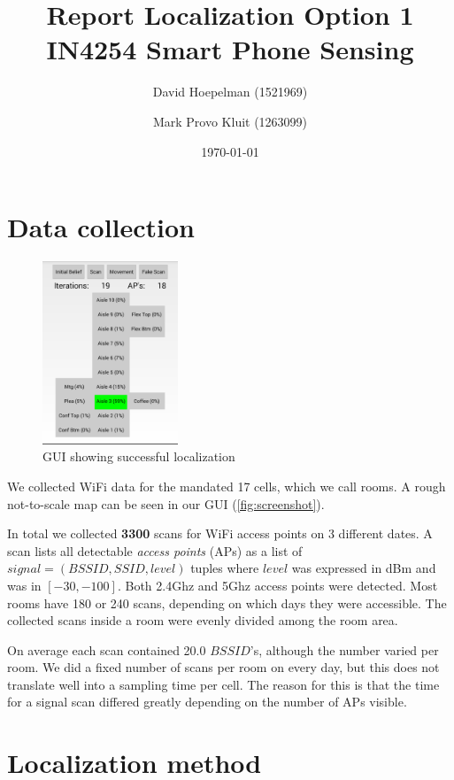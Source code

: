 \documentclass[a4paper,10pt,twoside]{IEEEtran}
\title{\huge{\textbf{Report Localization Option 1}\\IN4254 Smart Phone Sensing}}
\date{\today}
\author{David Hoepelman (1521969) \and Mark Provo Kluit (1263099)}
\begin{document}
\maketitle

\section{Data collection}
\label{sec:localization-method}

\begin{figure}
  \centering
    \includegraphics[width=0.36\textwidth]{screenshot}
    \caption{GUI showing successful localization}
    \label{fig:screenshot}
\end{figure}

We collected WiFi data for the mandated 17 cells, which we call rooms.
A rough not-to-scale map can be seen in our GUI (\autoref{fig:screenshot}).

In total we collected \textbf{3300} scans for WiFi access points on 3 different dates.
A scan lists all detectable \emph{access points} (APs) as a list of $signal=(BSSID, SSID, level)$ tuples where $level$ was expressed in dBm and was in $[-30,-100]$.
Both 2.4Ghz and 5Ghz access points were detected.
Most rooms have 180 or 240 scans, depending on which days they were accessible.
The collected scans inside a room were evenly divided among the room area.

On average each scan contained 20.0 $BSSID$'s, although the number varied per room.
We did a fixed number of scans per room on every day, but this does not translate well into a sampling time per cell.
The reason for this is that the time for a signal scan differed greatly depending on the number of APs visible.

\newpage

\section{Localization method}
\label{sec:data}
\end{document}
